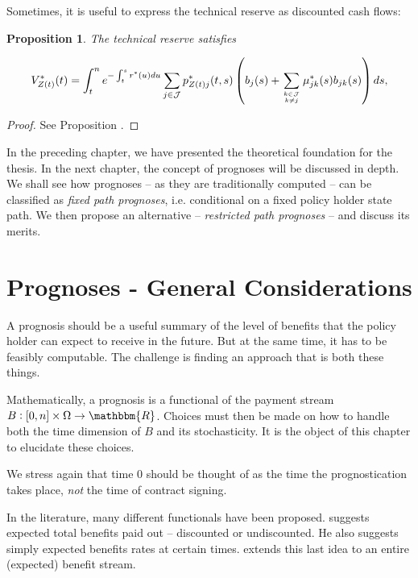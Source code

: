 \documentclass{article}
\newcommand{\1}[1]{\mathbbm{1}_{\left\lbrace #1 \right\rbrace}}
\theoremstyle{break}
\newtheorem{proposition}[definition]{Proposition}%
\theoremstyle{remark}
\numberwithin{equation}{section}
\begin{document}
Sometimes, it is useful to express the technical reserve as discounted cash flows: 

\begin{proposition}
	The technical reserve satisfies
	
	\begin{align*}
		V_{Z(t)}^*(t) = \int_t^n e^{-\int_t^s r^*(u)du} \sum_{j \in \mathcal{J}} p_{Z(t)j}^*(t,s) \left( b_j(s) + \sum_{k \in \mathcal{J} \atop k \neq j} \mu_{jk}^*(s)b_{jk}(s) \right) ds,
	\end{align*}
\end{proposition}

\begin{proof}
	See Proposition \cite{BuchardtMoller}.
\end{proof}

\bigbreak
\bigbreak
\bigbreak

In the preceding chapter, we have presented the theoretical foundation for the thesis. In the next chapter, the concept of prognoses will be discussed in depth. We shall see how prognoses -- as they are traditionally computed -- can be classified as \textit{fixed path prognoses}, i.e. conditional on a fixed policy holder state path. We then propose an alternative -- \textit{restricted path prognoses} -- and discuss its merits.

\newpage
\section{Prognoses - General Considerations}

A prognosis should be a useful summary of the level of benefits that the policy holder can expect to receive in the future. But at the same time, it has to be  feasibly computable. The challenge is finding an approach that is both these things.

Mathematically, a prognosis is a functional of the payment stream $B: [0,n] \times \Omega \to \mathbbm{R}$. Choices must then be made on how to handle both the time dimension of $B$ and its stochasticity. It is the object of this chapter to elucidate these choices.

We stress again that time 0 should be thought of as the time the prognostication takes place, \textit{not} the time of contract signing.

In the literature, many different functionals have been proposed. \cite{Norberg2001} suggests expected total benefits paid out -- discounted or undiscounted. He also suggests simply expected benefits rates at certain times. \cite{NinnaReitzel} extends this last idea to an entire (expected) benefit stream.
\end{document}
